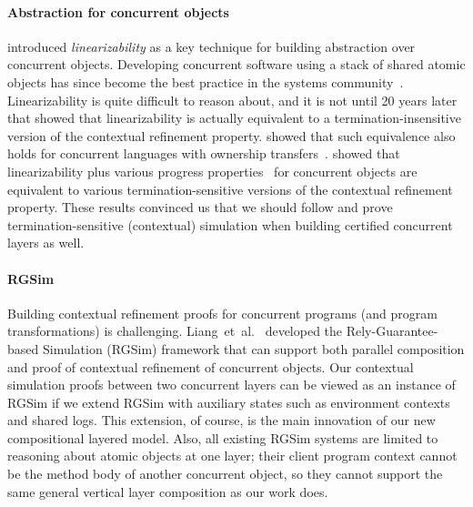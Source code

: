 \paragraph{Abstraction for concurrent objects}
\citet{herlihy90} introduced {\em linearizability} as a key technique
for building abstraction over concurrent objects. Developing
concurrent software using a stack of shared atomic objects has since
become the best practice in the systems
community~\cite{Herlihy08book,ospp11}. Linearizability is quite
difficult to reason about, and it is not until 20 years later that
\citet{filipovic10} showed that linearizability is actually equivalent
to a termination-insensitive version of the contextual refinement
property. \citet{Gotsman12concur} showed that such equivalence also
holds for concurrent languages with ownership
transfers~\cite{ohearn:concur04}.  \citet{liang13,lili16} showed that
linearizability plus various progress properties~\cite{Herlihy08book}
for concurrent objects are equivalent to various termination-sensitive
versions of the contextual refinement property. These results
convinced us that we should follow \citet{dscal15} and prove
termination-sensitive (contextual) simulation when building certified
concurrent layers as well.

\paragraph{RGSim} Building contextual refinement proofs
for concurrent programs (and program transformations) is challenging.
Liang~{et~al.}~\cite{RGSim,Liang14lics,lili16} developed the
Rely-Guarantee-based Simulation (RGSim) framework that can support both parallel
composition and proof of contextual refinement of concurrent
objects. Our contextual simulation proofs between two concurrent
layers can be viewed as an instance of RGSim if we extend RGSim with
auxiliary states such as environment contexts and shared logs. This
extension, of course, is the main innovation of our new compositional
layered model. Also, all existing RGSim systems are limited to reasoning
about atomic objects at one layer; their client program context cannot
be the method body of another concurrent object, so they cannot
support the same general vertical layer composition as our work does.

